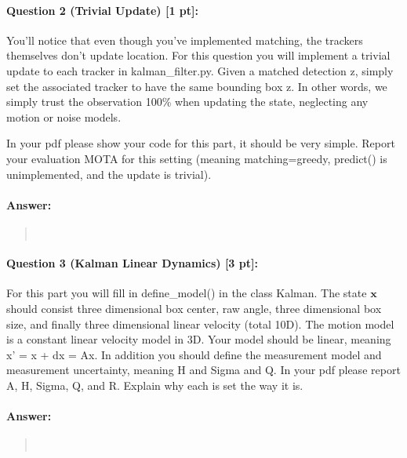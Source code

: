 \documentclass[11pt]{article}
\begin{document}
\paragraph{Question 2 (Trivial Update) [1 pt]:}
You'll notice that even though you've implemented matching, the trackers themselves don't update location. For this question you will implement a trivial update to each tracker in kalman\_filter.py. Given a matched detection z, simply set the associated tracker to have the same bounding box z. In other words, we simply trust the observation 100\% when updating the state, neglecting any motion or noise models.

In your pdf please show your code for this part, it should be very simple. Report your evaluation MOTA for this setting (meaning matching=greedy, predict() is unimplemented, and the update is trivial).
\paragraph{Answer:} 
\begin{quote}



\begin{lstlisting}[language=Python, basicstyle=\scriptsize]



\end{lstlisting}



\end{quote}


\paragraph{Question 3 (Kalman Linear Dynamics) [3 pt]:}
For this part you will fill in define\_model() in the class Kalman. The state $\mathbf{x}$ should consist three dimensional box center, raw angle, three dimensional box size, and finally three dimensional linear velocity (total 10D). The motion model is a constant linear velocity model in 3D. Your model should be linear, meaning x' = x + dx = Ax. In addition you should define the measurement model and measurement uncertainty, meaning H and Sigma and Q. In your pdf please report A, H, Sigma, Q, and R. Explain why each is set the way it is.
\paragraph{Answer:} 
\begin{quote}



\begin{lstlisting}[language=Python, basicstyle=\scriptsize]



\end{lstlisting}



\end{quote}
\end{document}
